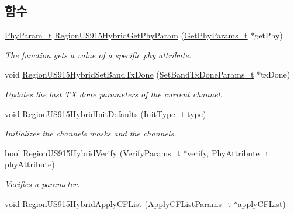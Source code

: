 \subsection*{함수}
\begin{DoxyCompactItemize}
\item 
\mbox{\hyperlink{group___r_e_g_i_o_n_gaed159b26e5c4677236b6e8677019db30}{Phy\+Param\+\_\+t}} \mbox{\hyperlink{group___r_e_g_i_o_n_u_s915_h_y_b_gaf078bd0d293c1a677ca53b7b6ca96c6e}{Region\+U\+S915\+Hybrid\+Get\+Phy\+Param}} (\mbox{\hyperlink{group___r_e_g_i_o_n_gab471483fff904f4f89bbc03f7fc380ab}{Get\+Phy\+Params\+\_\+t}} $\ast$get\+Phy)
\begin{DoxyCompactList}\small\item\em The function gets a value of a specific phy attribute. \end{DoxyCompactList}\item 
void \mbox{\hyperlink{group___r_e_g_i_o_n_u_s915_h_y_b_gaffb1cec48663f7fc2d7aeae9411e3d76}{Region\+U\+S915\+Hybrid\+Set\+Band\+Tx\+Done}} (\mbox{\hyperlink{group___r_e_g_i_o_n_gad0524aa0673c0814a71e7a4f9cade3fc}{Set\+Band\+Tx\+Done\+Params\+\_\+t}} $\ast$tx\+Done)
\begin{DoxyCompactList}\small\item\em Updates the last TX done parameters of the current channel. \end{DoxyCompactList}\item 
void \mbox{\hyperlink{group___r_e_g_i_o_n_u_s915_h_y_b_ga05e578b7048a754fbd73b71d3a938a7f}{Region\+U\+S915\+Hybrid\+Init\+Defaults}} (\mbox{\hyperlink{group___r_e_g_i_o_n_gaddc73ae10673ec925724e7870363bda9}{Init\+Type\+\_\+t}} type)
\begin{DoxyCompactList}\small\item\em Initializes the channels masks and the channels. \end{DoxyCompactList}\item 
bool \mbox{\hyperlink{group___r_e_g_i_o_n_u_s915_h_y_b_ga0fb0094a0833782259c6be87d3d4b141}{Region\+U\+S915\+Hybrid\+Verify}} (\mbox{\hyperlink{group___r_e_g_i_o_n_ga966d97bc2f25df1c09e92e60ef652276}{Verify\+Params\+\_\+t}} $\ast$verify, \mbox{\hyperlink{group___r_e_g_i_o_n_ga9445b07fdf77581ecfaf389970e635f8}{Phy\+Attribute\+\_\+t}} phy\+Attribute)
\begin{DoxyCompactList}\small\item\em Verifies a parameter. \end{DoxyCompactList}\item 
void \mbox{\hyperlink{group___r_e_g_i_o_n_u_s915_h_y_b_gadf2edbcb9c0e296e8de9fe4a40fc96ee}{Region\+U\+S915\+Hybrid\+Apply\+C\+F\+List}} (\mbox{\hyperlink{group___r_e_g_i_o_n_ga71588e9ad07e34b78fa91d51881fd3c6}{Apply\+C\+F\+List\+Params\+\_\+t}} $\ast$apply\+C\+F\+List)

\end{DoxyCompactItemize}
